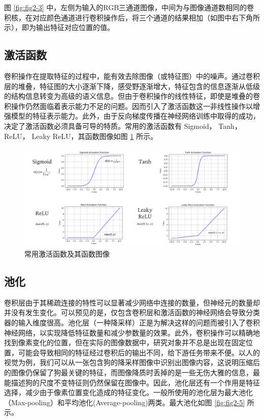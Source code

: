 图 \ref{fig:fig2-3} 中，左侧为输入的RGB三通道图像，中间为与图像通道数相同的卷积核，在对应颜色通道进行卷积操作后，将三个通道的结果相加（如图中右下角所示），即为输出特征对应位置的值。

\subsection{激活函数}

卷积操作在提取特征的过程中，能有效去除图像（或特征图）中的噪声。通过卷积层的堆叠，特征图的大小逐渐下降，感受野逐渐增大，特征包含的信息逐渐从低级的结构信息转变为高级的语义信息。但由于卷积操作的线性特征，即使是堆叠的卷积操作仍然面临着表示能力不足的问题。因而引入了激活函数这一非线性操作以增强模型的特征表示能力。此外，由于反向梯度传播在神经网络训练中取得的成功，决定了激活函数必须具备可导的特质。常用的激活函数有 Sigmoid， Tanh， ReLU， Leaky ReLU，其函数图像如图 \ref{fig:fig2-4} 所示。

\begin{figure}[!htbp]
	\centering
	\includegraphics{figures/5.png}
	\caption{常用激活函数及其函数图像}
	\label{fig:fig2-4}
	\vspace{-0.8cm}  %
\end{figure}

\subsection{池化}

卷积层由于其稀疏连接的特性可以显著减少网络中连接的数量，但神经元的数量却并没有发生变化。可以预见的是，仅包含卷积层和激活函数的神经网络会导致分类器的输入维度很高。池化层（一种降采样）正是为解决这样的问题而被引入了卷积神经网络，以实现降低特征数量和减少参数量的效果。此外，卷积操作可以精确地找到像素变化的位置，但在实际的图像数据中，研究对象并不总是出现在固定位置，可能会导致相同的特征经过卷积后的输出不同，给下游任务带来不便。以人的视觉为例，我们可以从一张包含狗的降采样图像中识别出图像内容，这说明压缩后的图像仍保留了狗最关键的特征，而图像降质时丢掉的是一些无伤大雅的信息，最能描述狗的尺度不变特征则仍然保留在图像中。因此，池化层还有一个作用是特征选择，减少由于像素位置变化造成的特征变化。一般所使用的池化层为最大池化（Max-pooling）和平均池化(Average-pooling)两类。最大池化如图 \ref{fig:fig2-5} 所示。

